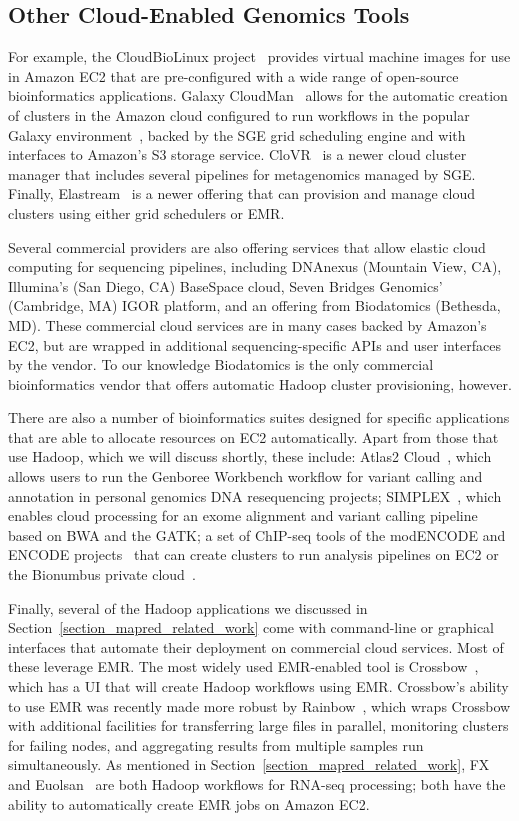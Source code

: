 \subsection{Other Cloud-Enabled Genomics Tools}

For example, the CloudBioLinux project~\cite{Krampis:2012wo} provides virtual machine images for use in Amazon EC2 that are pre-configured with a wide range of open-source bioinformatics applications. Galaxy CloudMan~\cite{Afgan:2010fa} allows for the automatic creation of clusters in the Amazon cloud configured to run workflows in the popular Galaxy environment~\cite{Giardine:2005ig}, backed by the SGE grid scheduling engine and with interfaces to Amazon's S3 storage service. CloVR~\cite{Angiuoli:2011wl} is a newer cloud cluster manager that includes several pipelines for metagenomics managed by SGE. Finally, Elastream~\cite{Issa:2013jp} is a newer offering that can provision and manage cloud clusters using either grid schedulers or EMR. 

Several commercial providers are also offering services that allow elastic cloud computing for sequencing pipelines, including DNAnexus (Mountain View, CA), Illumina's (San Diego, CA) BaseSpace cloud, Seven Bridges Genomics' (Cambridge, MA) IGOR platform, and an offering from Biodatomics (Bethesda, MD). These commercial cloud services are in many cases backed by Amazon's EC2, but are wrapped in additional sequencing-specific APIs and user interfaces by the vendor. To our knowledge Biodatomics is the only commercial bioinformatics vendor that offers automatic Hadoop cluster provisioning, however. 

There are also a number of bioinformatics suites designed for specific applications that are able to allocate resources on EC2 automatically. Apart from those that use Hadoop, which we will discuss shortly, these include: Atlas2 Cloud~\cite{Evani:2012eq}, which allows users to run the Genboree Workbench workflow for variant calling and annotation in personal genomics DNA resequencing projects; SIMPLEX~\cite{Fischer:2012bt}, which enables cloud processing for an exome alignment and variant calling pipeline based on BWA and the GATK; a set of ChIP-seq tools of the modENCODE and ENCODE projects~\cite{Trinh:2013ii} that can create clusters to run analysis pipelines on EC2 or the Bionumbus private cloud~\cite{bionimbus}.

Finally, several of the Hadoop applications we discussed in Section~\ref{section_mapred_related_work} come with command-line or graphical interfaces that automate their deployment on commercial cloud services. Most of these leverage EMR. The most widely used EMR-enabled tool is Crossbow~\cite{Langmead:2009p1225}, which has a UI that will create Hadoop workflows using EMR. Crossbow's ability to use EMR was recently made more robust by Rainbow~\cite{Zhao:2013hj}, which wraps Crossbow with additional facilities for transferring large files in parallel, monitoring clusters for failing nodes, and aggregating results from multiple samples run simultaneously. As mentioned in Section~\ref{section_mapred_related_work}, FX~\cite{Hong:2012du} and Euolsan~\cite{Jourdren:2012dc} are both Hadoop workflows for RNA-seq processing; both have the ability to automatically create EMR jobs on Amazon EC2.

